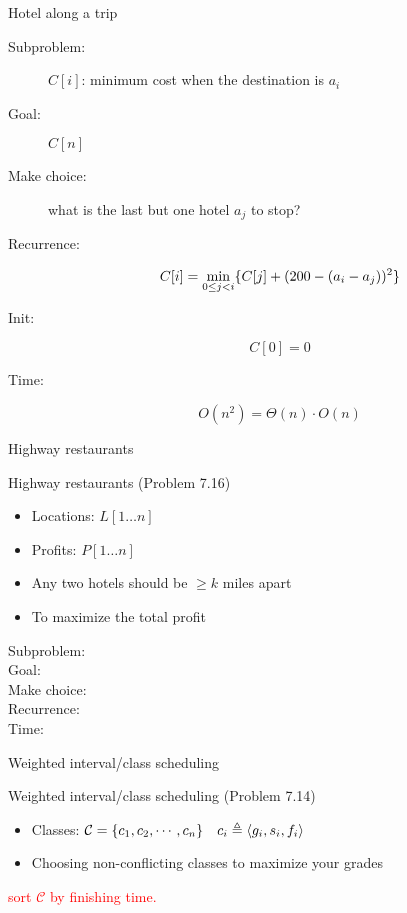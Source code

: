 \begin{frame}{Hotel along a trip}
  \begin{description}
	\item[Subproblem:] $C[i]$: minimum cost when the destination is $a_{i}$
	\item[Goal:] $C[n]$
	\pause
	\item[Make choice:] what is the last but one hotel $a_{j}$ to stop?
	\item[Recurrence:] 
	  \[
		C[i] = \min_{0 \le j < i} \{C[j] + (200 - (a_{i} - a_{j}))^{2}\}
	  \]
	\pause
	\item[Init:]
	  \[
		C[0] = 0
	  \]
	\item[Time:] 
	  \[
		O(n^2) = \Theta(n) \cdot O(n)
	  \]
  \end{description}
\end{frame}
\begin{frame}{Highway restaurants}
  \begin{exampleblock}{Highway restaurants (Problem 7.16)}
	\begin{itemize}
	  \item Locations: $L[1 \dots n]$
	  \item Profits: $P[1 \dots n]$
	  \item Any two hotels should be $\ge k$ miles apart
	  \item To maximize the total profit
	\end{itemize}
  \end{exampleblock}

  \begin{description}
	\item[Subproblem:]
	\item[Goal:] 
	\item[Make choice:] 
	\item[Recurrence:] 
	\item[Time:] 
  \end{description}
\end{frame}
\begin{frame}{Weighted interval/class scheduling}
  \begin{exampleblock}{Weighted interval/class scheduling (Problem 7.14)}
    \begin{itemize}
      \item Classes: $\mathcal{C} = \{c_{1}, c_{2}, \cdots, c_{n}\} \quad c_{i} \triangleq \langle g_{i}, s_{i}, f_{i} \rangle$
      \item Choosing non-conflicting classes to maximize your grades
    \end{itemize}
  \end{exampleblock}

  \centerline{\textcolor{red}{sort $\mathcal{C}$ by finishing time.}}
\end{frame}
